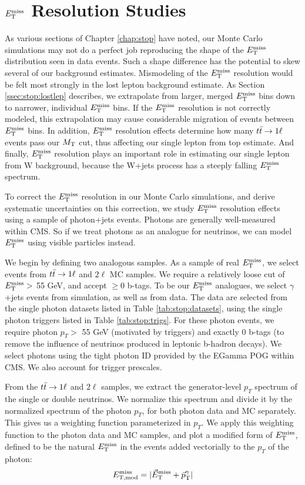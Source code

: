 \chapter{\texorpdfstring{$E_\text{T}^\text{miss}$}{MET} Resolution Studies}
\label{apx:stop:metres}

As various sections of Chapter \ref{chap:stop} have noted, our Monte
Carlo simulations may not do a perfect job reproducing the shape of %
the $E_\text{T}^\text{miss}$ distribution seen in data events. Such a shape difference has
the potential to skew several of our background estimates.
Mismodeling of the $E_\text{T}^\text{miss}$ resolution would be felt most strongly in
the lost lepton background estimate. As Section
\ref{ssec:stop:lostlep} describes, we
extrapolate from larger, merged $E_\text{T}^\text{miss}$ bins down to narrower,
individual $E_\text{T}^\text{miss}$ bins. If the $E_\text{T}^\text{miss}$ resolution is not correctly modeled,
this extrapolation may cause considerable migration of events between
$E_\text{T}^\text{miss}$ bins. In addition, $E_\text{T}^\text{miss}$ resolution effects determine how many
$t\bar{t} \rightarrow 1\ell$ events pass our $M_\text{T}$ cut, thus affecting our single
lepton from top estimate. And finally, $E_\text{T}^\text{miss}$ resolution plays an
important role in estimating our single lepton from W background,
because the W+jets process has a steeply falling $E_\text{T}^\text{miss}$ spectrum.

To correct the $E_\text{T}^\text{miss}$ resolution in our Monte Carlo simulations, and
derive systematic uncertainties on this correction, we study $E_\text{T}^\text{miss}$
resolution effects using a sample of photon+jets events. Photons are
generally well-measured within CMS. So if we treat photons as an
analogue for neutrinos, we can model $E_\text{T}^\text{miss}$ using visible particles
instead.

We begin by defining two analogous samples. As a sample of real
$E_\text{T}^\text{miss}$, we select events from $t\bar{t} \rightarrow 1\ell$ and $2\ell$ MC samples. We
require a relatively loose cut of $E_\text{T}^\text{miss} >$ 55 GeV, and accept $\geq$0
b-tags. To be our $E_\text{T}^\text{miss}$ analogues, we select $\gamma$+jets events
from simulation, as well as from data. The data are selected
from the single photon datasets listed in Table
\ref{tab:stop:datasets}, using the single photon triggers listed in
Table \ref{tab:stop:trigs}. For these photon events, we require photon $p_T
>$ 55 GeV (motivated by triggers) and exactly 0 b-tags (to remove the
influence of neutrinos produced in leptonic b-hadron decays). We
select photons using the tight photon ID provided by the EGamma POG
within CMS. We also account for trigger prescales.

From the $t\bar{t} \rightarrow 1\ell$ and $2\ell$ samples, we extract the
generator-level $p_T$ spectrum of the single or double neutrinos. We
normalize this spectrum and divide it by the normalized spectrum of
the photon $p_T$, for both photon data and MC separately. This gives
us a weighting function parameterized in $p_T$. We apply this
weighting function to the photon data and MC samples, and plot
a modified form of $E_\text{T}^\text{miss}$, defined to be the natural $E_\text{T}^\text{miss}$ in the
events added vectorially to the $p_T$ of the photon:
\begin{equation}
E_\text{T,mod}^\text{miss} = |\vec{E}_\text{T}^\text{miss} + \vec{p}_\text{T}^\gamma|
\end{equation}


